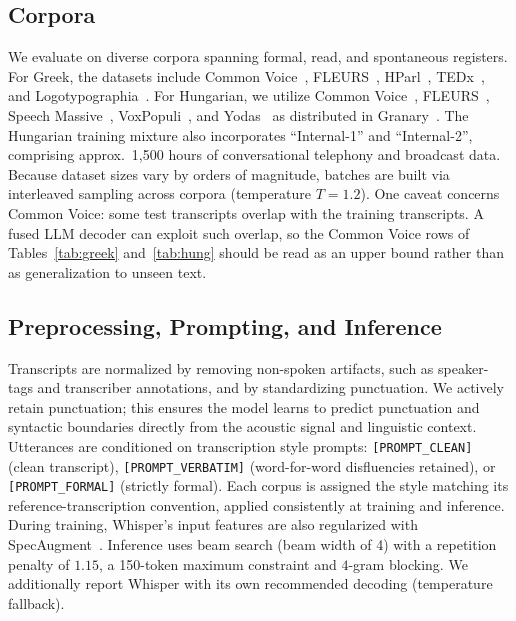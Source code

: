 \documentclass{article}
\begin{document}
\subsection{Corpora}
\noindent
We evaluate on diverse corpora spanning formal, read, and spontaneous registers. For Greek, the datasets include Common Voice~\cite{ardila2020commonvoice}, FLEURS~\cite{conneau2022fleurs}, HParl~\cite{paraskevopoulos2023hparl}, TEDx~\cite{salesky2021mtedx}, and Logotypographia~\cite{digalakis2003logotypographia}. For Hungarian, we utilize Common Voice~\cite{ardila2020commonvoice}, FLEURS~\cite{conneau2022fleurs}, Speech Massive~\cite{lee2024speechmassive}, VoxPopuli~\cite{wang2021voxpopuli}, and Yodas~\cite{li2023yodas} as distributed in Granary~\cite{koluguri2025granaryspeechrecognitiontranslation}. The Hungarian training mixture also incorporates ``Internal-1'' and ``Internal-2'', comprising approx.\ 1,500 hours of conversational telephony and broadcast data. Because dataset sizes vary by orders of magnitude, batches are built via interleaved sampling across corpora (temperature $T = 1.2$).
One caveat concerns Common Voice: some test transcripts overlap with the training transcripts. A fused LLM decoder can exploit such overlap, so the Common Voice rows of Tables~\ref{tab:greek} and~\ref{tab:hung} should be read as an upper bound rather than as generalization to unseen text.

\subsection{Preprocessing, Prompting, and Inference}
\noindent
Transcripts are normalized by removing non-spoken artifacts, such as speaker-tags and transcriber annotations, and by standardizing punctuation. We actively retain punctuation; this ensures the model learns to predict punctuation and syntactic boundaries directly from the acoustic signal and linguistic context. Utterances are conditioned on transcription style prompts: \texttt{[PROMPT\_CLEAN]} (clean transcript), \texttt{[PROMPT\_VERBATIM]} (word-for-word disfluencies retained), or \texttt{[PROMPT\_FORMAL]} (strictly formal). Each corpus is assigned the style matching its reference-transcription convention, applied consistently at training and inference. During training, Whisper's input features are also regularized with SpecAugment~\cite{park2019specaugment}. Inference uses beam search (beam width of 4) with a repetition penalty of $1.15$, a 150-token maximum constraint and $4$-gram blocking. We additionally report Whisper with its own recommended decoding (temperature fallback).
\end{document}
